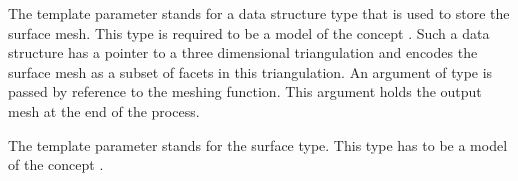 




The template parameter  
stands for  a  data structure type  that is used
to store  the surface mesh.  This type is required to be
a model of the concept .
Such a data structure 
has a pointer to a three dimensional triangulation and encodes
the surface mesh as a subset of facets in this triangulation.
An argument of type   is passed by reference to the meshing
function. This argument holds the output mesh at the end of the
process.

The template parameter   stands for the surface type.
This type has to be a model of the concept .

